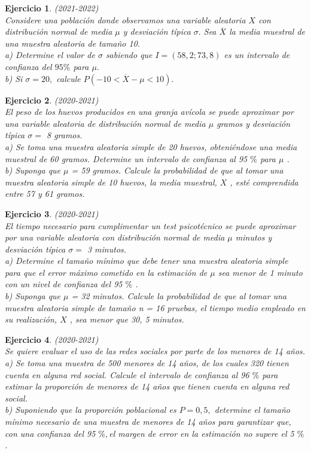 \documentclass[12pt, a4paper]{amsart}
\newtheorem{ejer}{Ejercicio}
\begin{document}
\begin{ejer}\em (2021-2022)\\
Considere una población donde observamos una variable aleatoria $X$ con distribución normal de media $\mu$ y desviación típica $\sigma.$ Sea $\overline{X}$ la media muestral de una muestra aleatoria de tamaño 10.\\
a) Determine el valor de $\sigma$ sabiendo que $I = (58,2; 73,8)$ es un intervalo de confianza del $95\%$ para $\mu.$\\
b) Si $\sigma = 20,$ calcule $P (-10 < \overline{X} - \mu < 10).$
\end{ejer}


\begin{ejer}\em (2020-2021)\\
El peso de los huevos producidos en una granja avícola se puede aproximar por una variable aleatoria de
distribución normal de media $\mu$ gramos y desviación típica  $\sigma =$ 8 gramos.\\
a) Se toma una muestra aleatoria simple de 20 huevos, obteniéndose una media muestral de 60 gramos.
Determine un intervalo de confianza al 95 $\%$ para $\mu$ .\\
b) Suponga que $\mu$ = 59 gramos. Calcule la probabilidad de que al tomar una muestra aleatoria simple de 10
huevos, la media muestral, $X$ , esté comprendida entre 57 y 61 gramos.
\end{ejer}


\begin{ejer}\em (2020-2021)\\
El tiempo necesario para cumplimentar un test psicotécnico se puede aproximar por una variable aleatoria con
distribución normal de media $\mu$ minutos y desviación típica  $\sigma =$ 3 minutos.\\
a) Determine el tamaño mínimo que debe tener una muestra aleatoria simple para que el error máximo cometido
en la estimación de $\mu$ sea menor de 1 minuto con un nivel de confianza del 95 $\%$ .\\
b) Suponga que $\mu$ = 32 minutos. Calcule la probabilidad de que al tomar una muestra aleatoria simple de
tamaño n = 16 pruebas, el tiempo medio empleado en su realización, $X$ , sea menor que 30, 5 minutos.
\end{ejer}

\begin{ejer}\em (2020-2021)\\
Se quiere evaluar el uso de las redes sociales por parte de los menores de 14 años.\\
a) Se toma una muestra de 500 menores de 14 años, de los cuales 320 tienen cuenta en alguna red social.
Calcule el intervalo de confianza al 96 $\%$ para estimar la proporción de menores de 14 años que tienen cuenta
en alguna red social.\\
b) Suponiendo que la proporción poblacional es $P = 0,5,$ determine el tamaño mínimo necesario de una muestra
de menores de 14 años para garantizar que, con una confianza del 95 $\%,$el margen de error en la estimación
no supere el 5 $\%$. 
\end{ejer}
\end{document}
